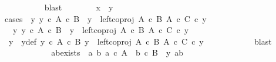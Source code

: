 \begin{isabellebody}
\ \ \ \ \ \ \ \ \isamarkupfalse%
\ blast\isanewline
\ \ \ \ \ \ \isamarkupfalse%
\ {\isachardoublequoteopen}x\ {\isacharequal}{\kern0pt}\ y{\isachardoublequoteclose}\ \ \isanewline
\ \ \ \ \ \ \isamarkupfalse%
{\isacharparenleft}{\kern0pt}cases\ {\isachardoublequoteopen}{\isasymexists}\ y{\isacharprime}{\kern0pt}{\isachardot}{\kern0pt}\ y{\isacharprime}{\kern0pt}\ {\isasymin}\isactrlsub c\ A\ {\isasymtimes}\isactrlsub c\ B\ {\isasymand}\ y\ {\isacharequal}{\kern0pt}\ {\isacharparenleft}{\kern0pt}left{\isacharunderscore}{\kern0pt}coproj\ {\isacharparenleft}{\kern0pt}A\ {\isasymtimes}\isactrlsub c\ B{\isacharparenright}{\kern0pt}\ {\isacharparenleft}{\kern0pt}A\ {\isasymtimes}\isactrlsub c\ C{\isacharparenright}{\kern0pt}{\isacharparenright}{\kern0pt}\ {\isasymcirc}\isactrlsub c\ y{\isacharprime}{\kern0pt}{\isachardoublequoteclose}{\isacharparenright}{\kern0pt}\isanewline
\ \ \ \ \ \ \ \ \isamarkupfalse%
\ {\isachardoublequoteopen}{\isasymexists}\ y{\isacharprime}{\kern0pt}{\isachardot}{\kern0pt}\ y{\isacharprime}{\kern0pt}\ {\isasymin}\isactrlsub c\ A\ {\isasymtimes}\isactrlsub c\ B\ {\isasymand}\ y\ {\isacharequal}{\kern0pt}\ {\isacharparenleft}{\kern0pt}left{\isacharunderscore}{\kern0pt}coproj\ {\isacharparenleft}{\kern0pt}A\ {\isasymtimes}\isactrlsub c\ B{\isacharparenright}{\kern0pt}\ {\isacharparenleft}{\kern0pt}A\ {\isasymtimes}\isactrlsub c\ C{\isacharparenright}{\kern0pt}{\isacharparenright}{\kern0pt}\ {\isasymcirc}\isactrlsub c\ y{\isacharprime}{\kern0pt}{\isachardoublequoteclose}\isanewline
\ \ \ \ \ \ \ \ \isamarkupfalse%
\ \isamarkupfalse%
\ y{\isacharprime}{\kern0pt}\ \ y{\isacharprime}{\kern0pt}{\isacharunderscore}{\kern0pt}def{\isacharcolon}{\kern0pt}\ {\isachardoublequoteopen}y{\isacharprime}{\kern0pt}\ {\isasymin}\isactrlsub c\ A\ {\isasymtimes}\isactrlsub c\ B{\isachardoublequoteclose}\ {\isachardoublequoteopen}y\ {\isacharequal}{\kern0pt}\ left{\isacharunderscore}{\kern0pt}coproj\ {\isacharparenleft}{\kern0pt}A\ {\isasymtimes}\isactrlsub c\ B{\isacharparenright}{\kern0pt}\ {\isacharparenleft}{\kern0pt}A\ {\isasymtimes}\isactrlsub c\ C{\isacharparenright}{\kern0pt}\ {\isasymcirc}\isactrlsub c\ y{\isacharprime}{\kern0pt}{\isachardoublequoteclose}\isanewline
\ \ \ \ \ \ \ \ \ \ \isamarkupfalse%
\ blast\isanewline
\ \ \ \ \ \ \ \ \isamarkupfalse%
\ \isamarkupfalse%
\ ab{\isacharunderscore}{\kern0pt}exists{\isacharcolon}{\kern0pt}\ {\isachardoublequoteopen}{\isasymexists}\ a{\isacharprime}{\kern0pt}\ b{\isacharprime}{\kern0pt}{\isachardot}{\kern0pt}\ a{\isacharprime}{\kern0pt}\ {\isasymin}\isactrlsub c\ A\ {\isasymand}\ b{\isacharprime}{\kern0pt}\ {\isasymin}\isactrlsub c\ B\ {\isasymand}\ y{\isacharprime}{\kern0pt}\ {\isacharequal}{\kern0pt}{\isasymlangle}a{\isacharprime}{\kern0pt}{\isacharcomma}{\kern0pt}b{\isacharprime}{\kern0pt}{\isasymrangle}{\isachardoublequoteclose}\isanewline

\end{isabellebody}
